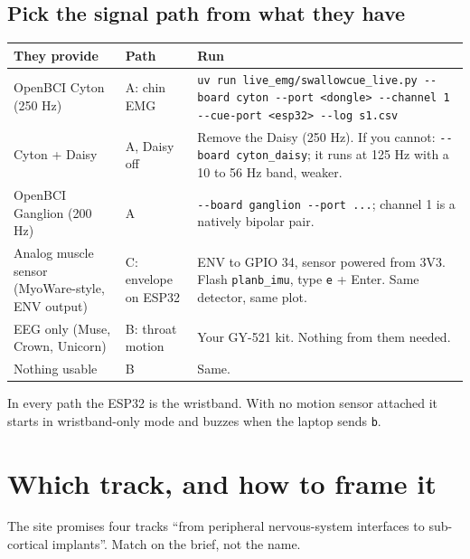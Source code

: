 \documentclass[10.5pt,a4paper]{article}
\newcommand{\f}[1]{\texttt{#1}}
\begin{document}
\subsection{Pick the signal path from what they have}
\begin{tabularx}{\linewidth}{@{}p{4.4cm}p{3.2cm}L@{}}
\toprule
They provide & Path & Run\\
\midrule
OpenBCI Cyton (250 Hz) & A: chin EMG & \f{uv run live\_emg/swallowcue\_live.py -{}-board cyton -{}-port <dongle> -{}-channel 1 -{}-cue-port <esp32> -{}-log s1.csv}\\
Cyton + Daisy & A, Daisy off & Remove the Daisy (250 Hz). If you cannot: \f{-{}-board cyton\_daisy}; it runs at 125 Hz with a 10 to 56 Hz band, weaker.\\
OpenBCI Ganglion (200 Hz) & A & \f{-{}-board ganglion -{}-port ...}; channel 1 is a natively bipolar pair.\\
Analog muscle sensor (MyoWare-style, ENV output) & C: envelope on ESP32 & ENV to GPIO 34, sensor powered from 3V3. Flash \f{planb\_imu}, type \f{e} + Enter. Same detector, same plot.\\
EEG only (Muse, Crown, Unicorn) & B: throat motion & Your GY-521 kit. Nothing from them needed.\\
Nothing usable & B & Same.\\
\bottomrule
\end{tabularx}
In every path the ESP32 is the wristband. With no motion sensor attached it starts in wristband-only mode and buzzes when the laptop sends \f{b}.

\section{Which track, and how to frame it}\label{sec:track}
The site promises four tracks ``from peripheral nervous-system interfaces to sub-cortical implants''. Match on the brief, not the name.
\end{document}
